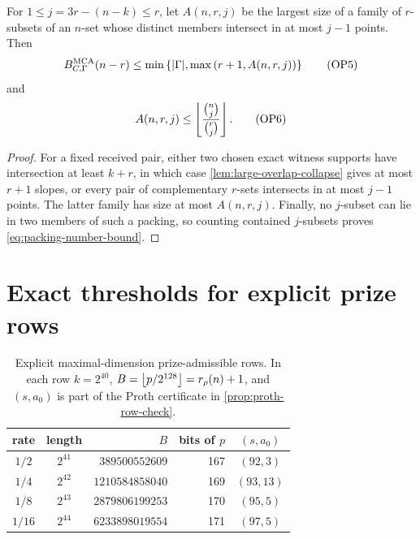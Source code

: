 \documentclass[11pt,a4paper]{amsart}
\numberwithin{equation}{section}
\theoremstyle{remark}
\begin{document}
\begin{proposition}
\label{prop:general-overlap-packing-upper}
For \(1\le j=3r-(n-k)\le r\), let \(A(n,r,j)\) be the largest size of a
family of \(r\)-subsets of an \(n\)-set whose distinct members intersect
in at most \(j-1\) points.  Then
\[
 B_{C,\Gamma}^{\rm MCA}(n-r)
 \le\min\left\{\lvert \Gamma\rvert,
     \max\left(r+1,A(n,r,j)\right)\right\}          \tag{OP5}
\label{eq:general-overlap-packing-upper}
\]
and
\[
 A(n,r,j)\le
 \left\lfloor \frac{\binom nj}{\binom rj}\right\rfloor.              \tag{OP6}
\label{eq:packing-number-bound}
\]
\end{proposition}

\begin{proof}
For a fixed received pair, either two chosen exact witness supports have
intersection at least \(k+r\), in which case
\cref{lem:large-overlap-collapse} gives at most \(r+1\) slopes, or every
pair of complementary \(r\)-sets intersects in at most \(j-1\) points.
The latter family has size at most \(A(n,r,j)\).  Finally, no \(j\)-subset
can lie in two members of such a packing, so counting contained
\(j\)-subsets proves \eqref{eq:packing-number-bound}.
\end{proof}


\section{Exact thresholds for explicit prize rows}\label{sec:prize-rows}

\begin{table}[H]
\centering
\caption{Explicit maximal-dimension prize-admissible rows.  In each row
\(k=2^{40}\), \(B=\left\lfloor p/2^{128}\right\rfloor=r_\rho(n)+1\), and \((s,a_0)\) is part of
the Proth certificate in \cref{prop:proth-row-check}.}
\label{tab:prize-proth-rows}
\small
\begin{tabular}{@{}ccrrc@{}}
\hline
rate & length & \(B\) & bits of \(p\) & \((s,a_0)\)\\
\hline
\(1/2\)  & \(2^{41}\) & \(389500552609\)  & 167 & \((92,3)\)\\
\(1/4\)  & \(2^{42}\) & \(1210584858040\) & 169 & \((93,13)\)\\
\(1/8\)  & \(2^{43}\) & \(2879806199253\) & 170 & \((95,5)\)\\
\(1/16\) & \(2^{44}\) & \(6233898019554\) & 171 & \((97,5)\)\\
\hline
\end{tabular}
\end{table}
\end{document}
